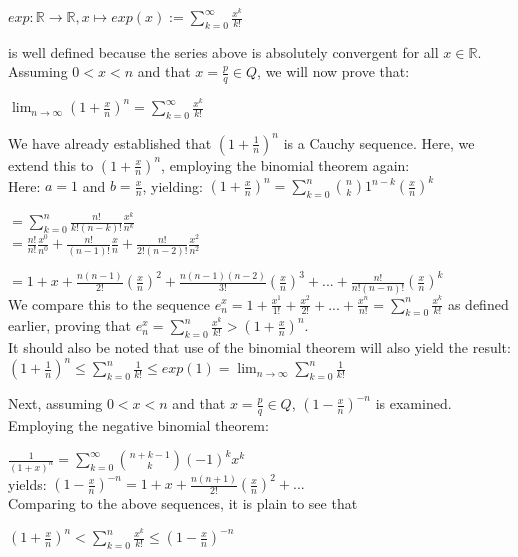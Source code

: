 \documentclass[12pt]{article}
\newcommand{\R}{\mathbb{R}}
\begin{document}
$exp: \R \rightarrow \R, x \mapsto exp(x):=\sum_{k=0}^\infty \frac{x^k}{k!}$ 

is well defined because the series above is absolutely convergent for all $x \in \R$. \\

Assuming $0 < x < n$ and that $x = \frac{p}{q} \in Q$, we will now prove that:

$\lim_{n \rightarrow \infty} (1 + \frac{x}{n})^n = \sum_{k=0}^\infty \frac{x^k}{k!}$

We have already established that $(1 + \frac{1}{n})^n$ is a Cauchy sequence. Here, we extend this to $(1 + \frac{x}{n})^n$, employing the binomial theorem again:\\

Here: $a = 1$ and $b = \frac{x}{n}$, yielding: $(1 + \frac{x}{n})^n = \sum_{k=0}^n \binom{n}{k} 1^{n-k} (\frac{x}{n})^k$

$= \sum_{k=0}^n \frac{n!}{k!(n-k)!} \frac{x^{k}}{n^k}$\\

$= \frac{n!}{n!}\frac{x^0}{n^0} + \frac{n!}{(n-1)!}\frac{x}{n} + \frac{n!}{2!(n-2)!}\frac{x^2}{n^2}$

$= 1 + x + \frac{n(n-1)}{2!}(\frac{x}{n})^2 + \frac{n(n-1)(n-2)}{3!}(\frac{x}{n})^3 + ... +  \frac{n!}{n!(n-n)!}(\frac{x}{n})^k$\\

We compare this to the sequence $e_n^x = 1 + \frac{x^1}{1!} + \frac{x^2}{2!} + ... + \frac{x^n}{n!} = \sum_{k=0}^n \frac{x^k}{k!}$ as defined earlier, proving that $e_n^x = \sum_{k=0}^n \frac{x^k}{k!} > (1 + \frac{x}{n})^n$.\\

It should also be noted that use of the binomial theorem will also yield the result: $(1 + \frac{1}{n})^n \leq \sum_{k=0}^n \frac{1}{k!} \leq exp(1) = \lim_{n \rightarrow \infty} \sum_{k=0}^n \frac{1}{k!}$

Next, assuming $0 < x < n$ and that $x = \frac{p}{q} \in Q$, $(1-\frac{x}{n})^{-n}$ is examined. Employing the negative binomial theorem:

$\frac{1}{(1+x)^n} = \sum_{k=0}^\infty \binom{n+k-1}{k}(-1)^kx^k$\\

yields: $(1-\frac{x}{n})^{-n} = 1 + x + \frac{n(n+1)}{2!}(\frac{x}{n})^2 + ...$\\

Comparing to the above sequences, it is plain to see that

$(1 + \frac{x}{n})^n < \sum_{k=0}^n \frac{x^k}{k!} \leq (1-\frac{x}{n})^{-n}$
\end{document}
